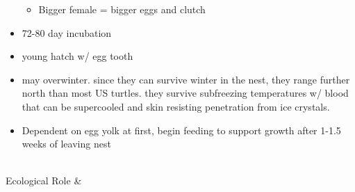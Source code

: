 \begin{center}
\begin{longtabu}
\begin{itemize}[noitemsep]
\begin{itemize}[noitemsep]
				\item Bigger female = bigger eggs and clutch
			\end{itemize}
		\item 72-80 day incubation
		\item young hatch w/ egg tooth
		\item may overwinter. since they can survive winter in the nest, they range further north than most US turtles. they survive subfreezing temperatures w/ blood that can be supercooled and skin resisting penetration from ice crystals.
		\item Dependent on egg yolk at first, begin feeding to support growth after 1-1.5 weeks of leaving nest
	\end{itemize}
	\\
	\hline
	Ecological Role &
	

\end{longtabu}
\end{center}
